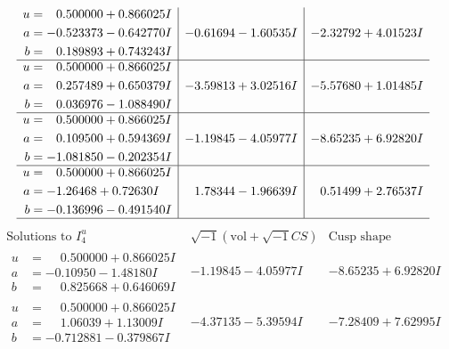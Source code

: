 \documentclass[1p]{elsarticle_modified}
\theoremstyle{definition}
\newcommand{\I}{\sqrt{-1}}
\begin{document}
$$\begin{array}{c|c|c}
\begin{aligned}
u &= \phantom{-}0.500000 + 0.866025 I \\
a &= -0.523373 - 0.642770 I \\
b &= \phantom{-}0.189893 + 0.743243 I\end{aligned}
 & -0.61694 - 1.60535 I & -2.32792 + 4.01523 I \\ \hline\begin{aligned}
u &= \phantom{-}0.500000 + 0.866025 I \\
a &= \phantom{-}0.257489 + 0.650379 I \\
b &= \phantom{-}0.036976 - 1.088490 I\end{aligned}
 & -3.59813 + 3.02516 I & -5.57680 + 1.01485 I \\ \hline\begin{aligned}
u &= \phantom{-}0.500000 + 0.866025 I \\
a &= \phantom{-}0.109500 + 0.594369 I \\
b &= -1.081850 - 0.202354 I\end{aligned}
 & -1.19845 - 4.05977 I & -8.65235 + 6.92820 I \\ \hline\begin{aligned}
u &= \phantom{-}0.500000 + 0.866025 I \\
a &= -1.26468 + 0.72630 I \\
b &= -0.136996 - 0.491540 I\end{aligned}
 & \phantom{-}1.78344 - 1.96639 I & \phantom{-}0.51499 + 2.76537 I\\
 \hline 
 \end{array}$$\newpage$$\begin{array}{c|c|c}  
\text{Solutions to }I^u_{4}& \I (\text{vol} + \sqrt{-1}CS) & \text{Cusp shape}\\
 \hline 
\begin{aligned}
u &= \phantom{-}0.500000 + 0.866025 I \\
a &= -0.10950 - 1.48180 I \\
b &= \phantom{-}0.825668 + 0.646069 I\end{aligned}
 & -1.19845 - 4.05977 I & -8.65235 + 6.92820 I \\ \hline\begin{aligned}
u &= \phantom{-}0.500000 + 0.866025 I \\
a &= \phantom{-}1.06039 + 1.13009 I \\
b &= -0.712881 - 0.379867 I\end{aligned}
 & -4.37135 - 5.39594 I & -7.28409 + 7.62995 I \\ \hline\begin{aligned}

\end{aligned}
\end{array}$$
\end{document}
